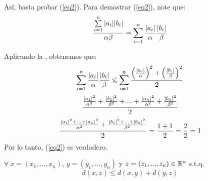 \begin{explanation}
\begin{enumerate}[label=\alph*)]
                Así, basta probar (\ref{eq2}). Para demostrar (\ref{eq2}), note que:
                \begin{equation*}
                    \frac{\sum\limits_{i=1}^{n} \abs{{a}_{i}}\abs{{b}_{i}}}{\alpha \beta} = \sum_{i=1}^{n} \frac{\abs{{a}_{i}}}{\alpha}\frac{\abs{{b}_{i}}}{\beta}
                \end{equation*}

                Aplicando la , obtenemos que:
                \begin{equation*}
                    \sum_{i=1}^{n} \frac{\abs{{a}_{i}}}{\alpha}\frac{\abs{{b}_{i}}}{\beta} \leqslant \sum_{i=1}^{n} \frac{{\left(\frac{\abs{{a}_{i}}}{\alpha}\right)}^{2}+\left(\frac{\abs{{b}_{i}}}{{\beta}}\right)^{2}}{2}
                \end{equation*}
                \begin{equation*}
                    \frac{\frac{{\abs{{a}_{1}}}^{2}}{{\alpha}^{2}}+\frac{{\abs{{b}_{1}}}^{2}}{{\beta}^{2}}+...+\frac{{\abs{{a}_{n}}}^{2}}{{\alpha}^{2}}+\frac{{\abs{{b}_{n}}}^{2}}{{\beta}^{2}}}{2}
                \end{equation*}
                \begin{equation*}
                    \frac{\frac{{\abs{{a}_{1}}}^{2}+...+{\abs{{a}_{n}}}^{2}}{{\alpha}^{2}}+\frac{{\abs{{b}_{1}}}^{2}+...+{\abs{{b}_{n}}}^{2}}{{\beta}^{2}}}{2} = \frac{1+1}{2} = \frac{2}{2} = 1
                \end{equation*}
                Por lo tanto, (\ref{eq2}) es verdadero. 
            \end{enumerate}
        \end{explanation}
        \begin{aff}[$D_4$]
            $\forall \: x=({x}_{1},...,{x}_{n})$, $y=({y}_{1},...,{y}_{n})$ y $z=({z}_{1},...,{z}_{n}) \in \mathbb{R}^n$ s.t.q.
            \begin{equation*}
                d(x,z) \leqslant d(x,y) + d(y,z)
            \end{equation*}
        \end{aff}

